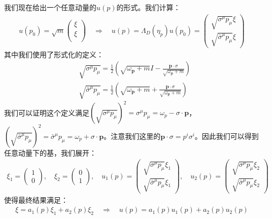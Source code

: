 我们现在给出一个任意动量的$ u(p) $的形式。我们计算：
\begin{align}
  u(p_0) = \sqrt{m}
  \begin{pmatrix}\xi \\ \xi\\
  \end{pmatrix} \quad \Rightarrow \quad u(p) = \Lambda_D(\eta_p)u(p_0) =
  \begin{pmatrix}\sqrt{\sigma^\mu p_\mu}\xi\\\sqrt{\bar{\sigma}^\mu p_\mu}\xi
  \end{pmatrix}
\end{align}
其中我们使用了形式化的定义：
\begin{align}
  &\sqrt{\sigma^\mu p_\mu} = \displaystyle\frac{1}{2} \left(
    \sqrt{\omega_{\mathbf{p}}+m} I - \frac{\mathbf{p}\cdot
  \sigma}{\sqrt{\omega_{\mathbf{p}}+m}} \right) \\
  & \sqrt{\bar{\sigma}^\mu p_\mu} =
  \frac{1}{2}\left(\sqrt{\omega_{\mathbf{p}}+m}+\frac{\mathbf{p}\cdot\sigma}{\sqrt{\omega_{\mathbf{p}}+m}}\right)
\end{align}
我们可以证明这个定义满足$ (\sqrt{\sigma^\mu p_\mu})^2 = \sigma^\mu p_\mu =
\omega_p - \sigma \cdot \mathbf{p} $，$ (\sqrt{\bar{\sigma}^\mu
p_\mu})^2 = \bar{\sigma}^\mu p_\mu = \omega_p + \sigma \cdot
\mathbf{p} $。注意我们这里的$ \mathbf{p} \cdot \sigma = p^i \sigma^i
$。因此我们可以得到任意动量下的基，我们展开：
\begin{align}
  \xi_1=
  \begin{pmatrix}1\\0
  \end{pmatrix},\quad \xi_2=
  \begin{pmatrix}0\\1
  \end{pmatrix} , \quad u_1(p)=
  \begin{pmatrix}\sqrt{\sigma^\mu p_\mu}\xi_1\\\sqrt{\bar{\sigma}^\mu
    p_\mu}\xi_1
  \end{pmatrix},\quad u_2(p)=
  \begin{pmatrix}\sqrt{\sigma^\mu p_\mu}\xi_2\\\sqrt{\bar{\sigma}^\mu
    p_\mu}\xi_2
  \end{pmatrix}
\end{align}
使得最终结果满足：
\begin{align}
  \xi = a_1(p)\xi_1 + a_2(p)\xi_2 \quad \Rightarrow \quad
  u(p)=a_1(p)u_1(p)+a_2(p)u_2(p)
\end{align}

